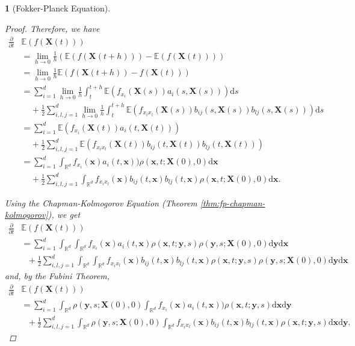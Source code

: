\documentclass[english]{article}
\numberwithin{equation}{section}
\numberwithin{figure}{section}
\theoremstyle{bolddescit}
\newtheorem{theorem}{\protect\theoremname}[section]
\theoremstyle{definition}
\theoremstyle{definition}
\theoremstyle{plain}
\theoremstyle{plain}
\theoremstyle{bolddesc}
\theoremstyle{plain}
\theoremstyle{remark}
\providecommand{\theoremname}{Theorem}
\begin{document}
\begin{theorem}[Fokker-Planck Equation]
\begin{proof}
    Therefore, we have
    \begin{align*}
      \frac{\partial}{\partial t}&\mathbb{E}(f(\mathbf{X}(t)))\\
      &= \lim_{h \to 0} \frac{1}{h} (\mathbb{E}(f(\mathbf{X}(t+h))) - \mathbb{E}(f(\mathbf{X}(t))))\\
      &= \lim_{h \to 0} \frac{1}{h} \mathbb{E}(f(\mathbf{X}(t+h)) - f(\mathbf{X}(t))) \tag{linearity}\\
      &= \sum_{i=1}^{d} \lim_{h \to 0} \frac{1}{h} \int_t^{t+h} \mathbb{E}(f_{x_i}(\mathbf{X}(s)) a_i(s,\mathbf{X}(s))) \mathrm{d}s\\
        &\ \ \ \ \ + \frac{1}{2} \sum_{i,l,j=1}^{d} \lim_{h \to 0} \frac{1}{h} \int_t^{t+h} \mathbb{E}\left(f_{x_i x_l}(\mathbf{X}(s)) b_{ij}(s,\mathbf{X}(s)) b_{lj}(s,\mathbf{X}(s))\right) \mathrm{d}s\\
      &= \sum_{i=1}^{d} \mathbb{E}(f_{x_i}(\mathbf{X}(t)) a_i(t,\mathbf{X}(t)))\\
        &\ \ \ \ \ + \frac{1}{2} \sum_{i,l,j=1}^{d} \mathbb{E}\left(f_{x_i x_l}(\mathbf{X}(t)) b_{ij}(t,\mathbf{X}(t)) b_{lj}(t,\mathbf{X}(t))\right)\\
      &= \sum_{i=1}^{d} \int_{\mathbb{R}^d} f_{x_i}(\mathbf{x}) a_i(t,\mathbf{x}))\rho(\mathbf{x},t;\mathbf{X}(0),0) \mathrm{d}\mathbf{x}\\
        &\ \ \ \ \ + \frac{1}{2} \sum_{i,l,j=1}^{d} \int_{\mathbb{R}^d} f_{x_i x_l}(\mathbf{x}) b_{ij}(t,\mathbf{x}) b_{lj}(t,\mathbf{x}) \rho(\mathbf{x},t;\mathbf{X}(0),0) \mathrm{d}\mathbf{x}.
    \end{align*}

    Using the Chapman-Kolmogorov Equation (Theorem \ref{thm:fp-chapman-kolmogorov}), we get
    \begin{align*}
      \frac{\partial}{\partial t}&\mathbb{E}(f(\mathbf{X}(t)))\\
      &= \sum_{i=1}^{d} \int_{\mathbb{R}^d} \int_{\mathbb{R}^d} f_{x_i}(\mathbf{x}) a_i(t,\mathbf{x})\rho(\mathbf{x},t;\mathbf{y},s) \rho(\mathbf{y},s;\mathbf{X}(0),0) \mathrm{d}\mathbf{y} \mathrm{d}\mathbf{x}\\
        &\ \ \ + \frac{1}{2} \sum_{i,l,j=1}^{d} \int_{\mathbb{R}^d} \int_{\mathbb{R}^d} f_{x_i x_l}(\mathbf{x}) b_{ij}(t,\mathbf{x}) b_{lj}(t,\mathbf{x}) \rho(\mathbf{x},t;\mathbf{y},s) \rho(\mathbf{y},s;\mathbf{X}(0),0) \mathrm{d}\mathbf{y} \mathrm{d}\mathbf{x}
    \end{align*}
    and, by the Fubini Theorem,
    \begin{align*}
      \frac{\partial}{\partial t}&\mathbb{E}(f(\mathbf{X}(t)))\\
      &= \sum_{i=1}^{d} \int_{\mathbb{R}^d}  \rho(\mathbf{y},s;\mathbf{X}(0),0) \int_{\mathbb{R}^d} f_{x_i}(\mathbf{x}) a_i(t,\mathbf{x}))\rho(\mathbf{x},t;\mathbf{y},s) \mathrm{d}\mathbf{x} \mathrm{d}\mathbf{y}\\
        &\ \ \ + \frac{1}{2} \sum_{i,l,j=1}^{d} \int_{\mathbb{R}^d} \rho(\mathbf{y},s;\mathbf{X}(0),0) \int_{\mathbb{R}^d} f_{x_i x_l}(\mathbf{x}) b_{ij}(t,\mathbf{x}) b_{lj}(t,\mathbf{x}) \rho(\mathbf{x},t;\mathbf{y},s) \mathrm{d}\mathbf{x} \mathrm{d}\mathbf{y}.
    \end{align*}


\end{proof}
\end{theorem}
\end{document}
